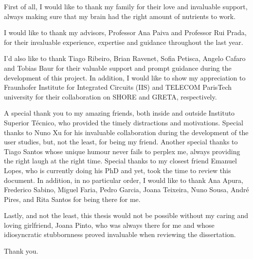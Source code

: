 First of all, I would like to thank my family for their love and invaluable support, always making sure that my brain had the right amount of nutrients to work.

I would like to thank my advisors, Professor Ana Paiva and Professor Rui Prada, for their invaluable experience, expertise and guidance throughout the last year.

I'd also like to thank Tiago Ribeiro, Brian Ravenet, Sofia Petisca, Angelo Cafaro and Tobias Baur for their valuable support and prompt guidance during the development of this project. In addition, I would like to show my appreciation to Fraunhofer Institute for Integrated Circuits (IIS) and TELECOM ParisTech university for their collaboration on SHORE and GRETA, respectively.

A special thank you to my amazing friends, both inside and outside Instituto Superior Técnico, who provided the timely distractions and motivations. Special thanks to Nuno Xu for his invaluable collaboration during the development of the user studies, but, not the least, for being my friend. Another special thanks to Tiago Santos whose unique humour never fails to perplex me, always providing the right laugh at the right time. Special thanks to my closest friend Emanuel Lopes, who is currently doing his PhD and yet, took the time to review this document. In addition, in no particular order, I would like to thank Ana Apura, Frederico Sabino, Miguel Faria, Pedro Garcia, Joana Teixeira, Nuno Sousa, André Pires, and Rita Santos for being there for me.

Lastly, and not the least, this thesis would not be possible without my caring and loving girlfriend, Joana Pinto, who was always there for me and whose idiosyncratic stubbornness proved invaluable when reviewing the dissertation. 

Thank you.